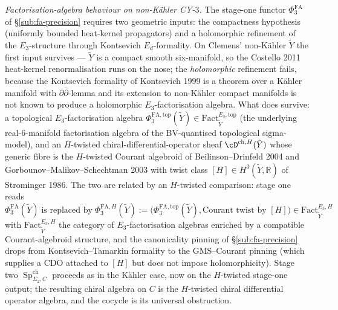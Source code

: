 \documentclass[11pt,reqno]{amsart}
\theoremstyle{plain}
\theoremstyle{definition}
\theoremstyle{remark}
\DeclareMathOperator{\Sp}{Sp}
\newcommand{\Rbb}{\mathbb{R}}
\begin{document}
\emph{Factorisation-algebra behaviour on non-Kähler CY-$3$.} The stage-one functor $\Phi^{\mathrm{FA}}_3$ of \S\ref{sub:fa-precision} requires two geometric inputs: the compactness hypothesis (uniformly bounded heat-kernel propagators) and a holomorphic refinement of the $E_3$-structure through Kontsevich $E_d$-formality. On Clemens' non-Kähler $\tilde Y$ the first input survives --- $\tilde Y$ is a compact smooth six-manifold, so the Costello 2011 heat-kernel renormalisation runs on the nose; the \emph{holomorphic} refinement fails, because the Kontsevich formality of Kontsevich 1999 is a theorem over a Kähler manifold with $\partial\bar\partial$-lemma and its extension to non-Kähler compact manifolds is not known to produce a holomorphic $E_3$-factorisation algebra. What does survive: a topological $E_3$-factorisation algebra $\Phi^{\mathrm{FA}, \mathrm{top}}_3(\tilde Y) \in \mathrm{Fact}^{E_3, \mathrm{top}}_{\tilde Y}$ (the underlying real-$6$-manifold factorisation algebra of the BV-quantised topological sigma-model), and an $H$-twisted chiral-differential-operator sheaf $\cD^{\mathrm{ch}, H}(\tilde Y)$ whose generic fibre is the $H$-twisted Courant algebroid of Beilinson--Drinfeld 2004 and Gorbounov--Malikov--Schechtman 2003 with twist class $[H] \in H^3(\tilde Y, \Rbb)$ of Strominger 1986. The two are related by an $H$-twisted comparison: stage one reads
\[
  \Phi^{\mathrm{FA}}_3(\tilde Y) \; \text{is replaced by} \; \Phi^{\mathrm{FA}, H}_3(\tilde Y) := \bigl(\Phi^{\mathrm{FA}, \mathrm{top}}_3(\tilde Y), \text{Courant twist by } [H]\bigr) \in \mathrm{Fact}^{E_3, H}_{\tilde Y}
\]
with $\mathrm{Fact}^{E_3, H}_{\tilde Y}$ the category of $E_3$-factorisation algebras enriched by a compatible Courant-algebroid structure, and the canonicality pinning of \S\ref{sub:fa-precision} drops from Kontsevich--Tamarkin formality to the GMS--Courant pinning (which supplies a CDO attached to $[H]$ but does not impose holomorphicity). Stage two $\Sp^{\mathrm{ch}}_{\Sigma_2, C}$ proceeds as in the Kähler case, now on the $H$-twisted stage-one output; the resulting chiral algebra on $C$ is the $H$-twisted chiral differential operator algebra, and the cocycle is its universal obstruction.
\end{document}
